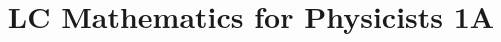 \documentclass[a4paper]{article}
\title{LC Mathematics for Physicists 1A}
\begin{document}
    \maketitle
    \hrulefill
    \tableofcontents
    
    
\end{document}
